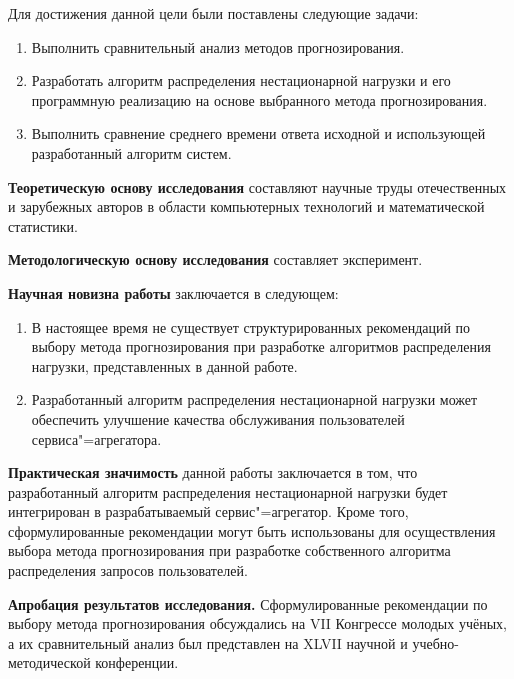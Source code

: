 Для достижения данной цели были поставлены следующие задачи:
\begin{enumerate}
	\item Выполнить сравнительный анализ методов прогнозирования.
	\item Разработать алгоритм распределения нестационарной нагрузки и его 
		программную реализацию на основе выбранного метода 
		прогнозирования.
	\item Выполнить сравнение среднего времени ответа исходной и 
		использующей разработанный алгоритм систем.
\end{enumerate}

{\bfseries Теоретическую основу исследования} составляют научные труды
отечественных и зарубежных авторов в области компьютерных технологий и
математической статистики.

{\bfseries Методологическую основу исследования} составляет эксперимент.

{\bfseries Научная новизна работы} заключается в следующем:
\begin{enumerate}
	\item В настоящее время не существует структурированных рекомендаций 
		по выбору метода прогнозирования при разработке алгоритмов 
		распределения нагрузки, представленных в данной работе. 
	\item Разработанный алгоритм распределения нестационарной нагрузки 
		может обеспечить улучшение качества обслуживания пользователей
		сервиса"=агрегатора.
\end{enumerate}

{\bfseries Практическая значимость} данной работы заключается в том, что 
разработанный алгоритм распределения нестационарной нагрузки будет
интегрирован в разрабатываемый сервис"=агрегатор. Кроме того, 
сформулированные рекомендации могут быть использованы для осуществления 
выбора метода прогнозирования при разработке собственного алгоритма 
распределения запросов пользователей.

{\bfseries Апробация результатов исследования.} Сформулированные 
рекомендации по выбору метода прогнозирования обсуждались на VII Конгрессе 
молодых учёных, а их сравнительный анализ был представлен на XLVII научной 
и учебно-методической конференции.


